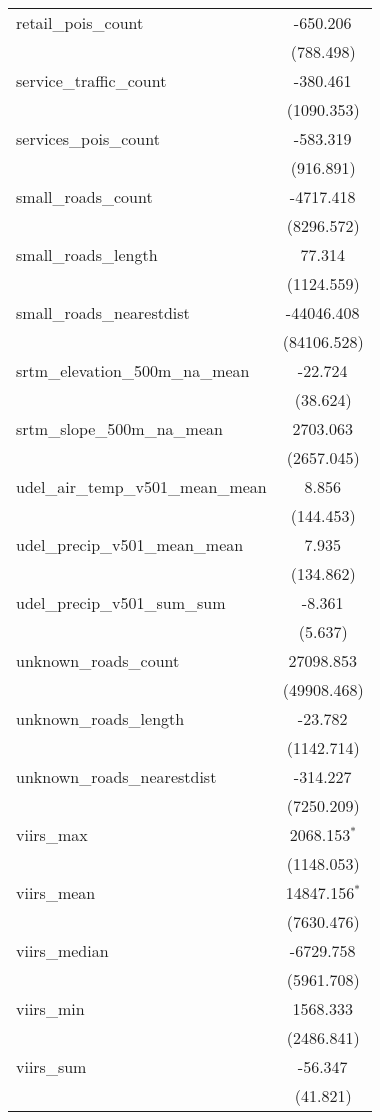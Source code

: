 \begin{table}[!htbp]
\begin{tabular}{@{\extracolsep{5pt}}lc}
 retail_pois_count & -650.206$^{}$ \\
  & (788.498) \\
 service_traffic_count & -380.461$^{}$ \\
  & (1090.353) \\
 services_pois_count & -583.319$^{}$ \\
  & (916.891) \\
 small_roads_count & -4717.418$^{}$ \\
  & (8296.572) \\
 small_roads_length & 77.314$^{}$ \\
  & (1124.559) \\
 small_roads_nearestdist & -44046.408$^{}$ \\
  & (84106.528) \\
 srtm_elevation_500m_na_mean & -22.724$^{}$ \\
  & (38.624) \\
 srtm_slope_500m_na_mean & 2703.063$^{}$ \\
  & (2657.045) \\
 udel_air_temp_v501_mean_mean & 8.856$^{}$ \\
  & (144.453) \\
 udel_precip_v501_mean_mean & 7.935$^{}$ \\
  & (134.862) \\
 udel_precip_v501_sum_sum & -8.361$^{}$ \\
  & (5.637) \\
 unknown_roads_count & 27098.853$^{}$ \\
  & (49908.468) \\
 unknown_roads_length & -23.782$^{}$ \\
  & (1142.714) \\
 unknown_roads_nearestdist & -314.227$^{}$ \\
  & (7250.209) \\
 viirs_max & 2068.153$^{*}$ \\
  & (1148.053) \\
 viirs_mean & 14847.156$^{*}$ \\
  & (7630.476) \\
 viirs_median & -6729.758$^{}$ \\
  & (5961.708) \\
 viirs_min & 1568.333$^{}$ \\
  & (2486.841) \\
 viirs_sum & -56.347$^{}$ \\
  & (41.821) \\

\end{tabular}
\end{table}
